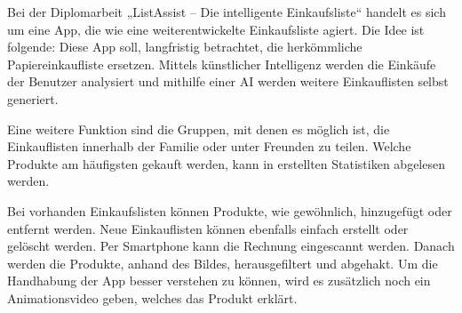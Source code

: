 Bei der Diplomarbeit „ListAssist -- Die intelligente Einkaufsliste“ handelt es sich um 
eine App, die wie eine weiterentwickelte Einkaufsliste agiert.
Die Idee ist folgende: Diese App soll, langfristig betrachtet, die 
herkömmliche Papiereinkaufliste ersetzen. Mittels künstlicher Intelligenz 
werden die Einkäufe der Benutzer analysiert und mithilfe einer AI werden
weitere Einkauflisten selbst generiert.

Eine weitere Funktion sind die Gruppen, mit denen es möglich ist, 
die Einkauflisten innerhalb der Familie oder unter Freunden zu teilen.
Welche Produkte am häufigsten gekauft werden, kann in erstellten
Statistiken abgelesen werden.

Bei vorhanden Einkaufslisten können Produkte, wie gewöhnlich,
hinzugefügt oder entfernt werden. Neue Einkauflisten können 
ebenfalls einfach erstellt oder gelöscht werden. Per Smartphone
kann die Rechnung eingescannt werden. Danach werden die Produkte, 
anhand des Bildes, herausgefiltert und abgehakt.
Um die Handhabung der App besser verstehen zu können, wird 
es zusätzlich noch ein Animationsvideo geben, welches das Produkt erklärt.
